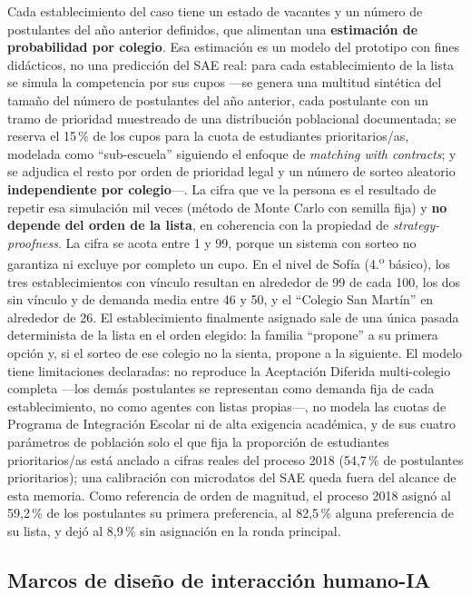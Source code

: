 Cada establecimiento del caso tiene un estado de vacantes y un número de postulantes del año anterior definidos, que alimentan una \textbf{estimación de probabilidad por colegio}. Esa estimación es un modelo del prototipo con fines didácticos, no una predicción del SAE real: para cada establecimiento de la lista se simula la competencia por sus cupos —se genera una multitud sintética del tamaño del número de postulantes del año anterior, cada postulante con un tramo de prioridad muestreado de una distribución poblacional documentada; se reserva el 15\,\% de los cupos para la cuota de estudiantes prioritarios/as, modelada como ``sub-escuela'' siguiendo el enfoque de \emph{matching with contracts}; y se adjudica el resto por orden de prioridad legal y un número de sorteo aleatorio \textbf{independiente por colegio}—. La cifra que ve la persona es el resultado de repetir esa simulación mil veces (método de Monte Carlo con semilla fija) y \textbf{no depende del orden de la lista}, en coherencia con la propiedad de \emph{strategy-proofness}. La cifra se acota entre 1 y 99, porque un sistema con sorteo no garantiza ni excluye por completo un cupo. En el nivel de Sofía (4.\textsuperscript{o} básico), los tres establecimientos con vínculo resultan en alrededor de 99 de cada 100, los dos sin vínculo y de demanda media entre 46 y 50, y el ``Colegio San Martín'' en alrededor de 26. El establecimiento finalmente asignado sale de una única pasada determinista de la lista en el orden elegido: la familia ``propone'' a su primera opción y, si el sorteo de ese colegio no la sienta, propone a la siguiente. El modelo tiene limitaciones declaradas: no reproduce la Aceptación Diferida multi-colegio completa —los demás postulantes se representan como demanda fija de cada establecimiento, no como agentes con listas propias—, no modela las cuotas de Programa de Integración Escolar ni de alta exigencia académica, y de sus cuatro parámetros de población solo el que fija la proporción de estudiantes prioritarios/as está anclado a cifras reales del proceso 2018 (54,7\,\% de postulantes prioritarios); una calibración con microdatos del SAE queda fuera del alcance de esta memoria. Como referencia de orden de magnitud, el proceso 2018 asignó al 59,2\,\% de los postulantes su primera preferencia, al 82,5\,\% alguna preferencia de su lista, y dejó al 8,9\,\% sin asignación en la ronda principal.

\subsection{Marcos de diseño de interacción humano-IA}\label{sec:fase3-marcos}

